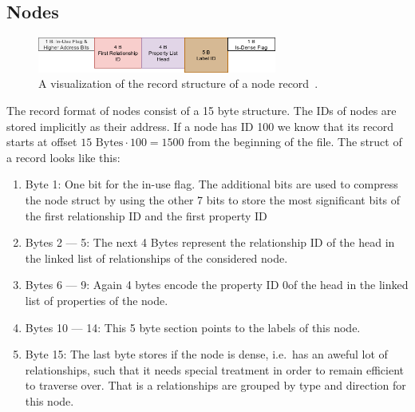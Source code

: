         \subsection*{Nodes}
            \begin{figure}[htp]
                \begin{center}
                    \includegraphics[keepaspectratio,height=0.4\textheight,width=0.7\textwidth]{img/03-preliminaries/node_record.png}
                \end{center}
                \caption{A visualization of the record structure of a node record~\autocite{neo4jNodeRecordFormat}.}
                \label{node-record-format}
            \end{figure}
            The record format of nodes consist of a 15 byte structure.
            The IDs of nodes are stored implicitly as their address.
            If a node has ID 100 we know that its record starts at offset $15 \text{ Bytes} \cdot 100 = 1500$ from the beginning of the file.
            The struct of a record looks like this:
            \begin{enumerate}
                \item Byte 1: One bit for the in-use flag. 
                The additional bits are used to compress the node struct by using the other 7 bits to store the most significant bits of the first relationship ID and the first property ID 
                \item Bytes 2 --- 5: The next 4 Bytes represent the relationship ID of the head in the linked list of relationships of the considered node.
                \item Bytes 6 --- 9: Again 4 bytes encode the property ID 0of the head in the linked list of properties of the node.
                \item Bytes 10 --- 14: This 5 byte section points to the labels of this node.
                \item Byte 15: The last byte stores if the node is dense, i.e.\ has an aweful lot of relationships, such that it needs special treatment in order to remain efficient to traverse over.
                That is a relationships are grouped by type and direction for this node.
            \end{enumerate}
            
